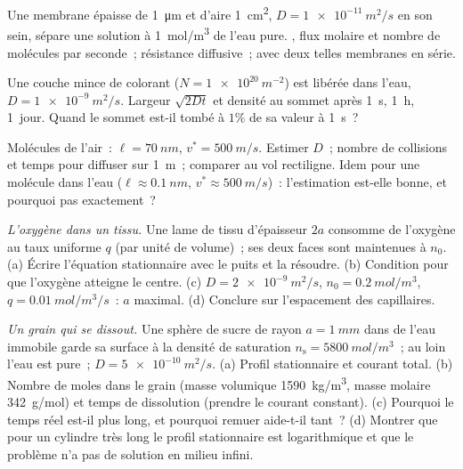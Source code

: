 \begin{exercise}[$\star$]\label{exo:b2:particle-diffusion:2}
Une membrane épaisse de \qty{1}{\micro m} et d'aire \qty{1}{cm^2}, $D =
\qty{1e-11}{m^2/s}$ en son sein, sépare une solution à \qty{1}{mol/m^3}
de l'eau pure. , flux molaire et nombre de molécules
par seconde~; résistance diffusive~; avec deux telles membranes en série.
\end{exercise}

\begin{exercise}[$\star$]\label{exo:b2:particle-diffusion:3}
Une couche mince de colorant ($N = \qty{1e20}{m^{-2}}$) est libérée dans l'eau,
$D = \qty{1e-9}{m^2/s}$. Largeur $\sqrt{2Dt}$ et densité au sommet après
\qty{1}{s}, \qty{1}{h}, \qty{1}{jour}. Quand le sommet est-il tombé à
$1\%$ de sa valeur à \qty{1}{s}~?
\end{exercise}

\begin{exercise}[$\star$]\label{exo:b2:particle-diffusion:4}
Molécules de l'air~: $\ell = \qty{70}{nm}$, $v^* = \qty{500}{m/s}$. Estimer
$D$~; nombre de collisions et temps pour diffuser sur \qty{1}{m}~; comparer au
vol rectiligne. Idem pour une molécule dans l'eau ($\ell \approx
\qty{0.1}{nm}$, $v^* \approx \qty{500}{m/s}$)~: l'estimation est-elle bonne, et
pourquoi pas exactement~?
\end{exercise}

\begin{exercise}[$\star\star$]\label{exo:b2:particle-diffusion:5}
\emph{L'oxygène dans un tissu.} Une lame de tissu d'épaisseur $2a$ consomme
de l'oxygène au taux uniforme $q$ (par unité de volume)~; ses deux faces sont
maintenues à $n_0$. (a) Écrire l'équation stationnaire avec le puits et la résoudre.
(b) Condition pour que l'oxygène atteigne le centre. (c) $D = \qty{2e-9}{m^2/s}$,
$n_0 = \qty{0.2}{mol/m^3}$, $q = \qty{0.01}{mol/m^3/s}$~: $a$ maximal. (d)
Conclure sur l'espacement des capillaires.
\end{exercise}

\begin{exercise}[$\star\star$]\label{exo:b2:particle-diffusion:6}
\emph{Un grain qui se dissout.} Une sphère de sucre de rayon $a = \qty{1}{mm}$
dans de l'eau immobile garde sa surface à la densité de saturation $n_{\text{s}}
= \qty{5800}{mol/m^3}$~; au loin l'eau est pure~; $D =
\qty{5e-10}{m^2/s}$. (a) Profil stationnaire et courant total. (b)
Nombre de moles dans le grain (masse volumique \qty{1590}{kg/m^3}, masse molaire
\qty{342}{g/mol}) et temps de dissolution (prendre le courant constant).
(c) Pourquoi le temps réel est-il plus long, et pourquoi remuer aide-t-il tant~?
(d) Montrer que pour un cylindre très long le profil stationnaire est
logarithmique et que le problème n'a pas de solution en milieu infini.
\end{exercise}

